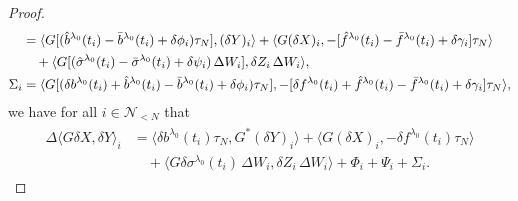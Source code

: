 \documentclass[11pt]{article}
\numberwithin{equation}{section}
\theoremstyle{definition}
\theoremstyle{remark}
\def\l{\label}  \def\f{\frac}  \def\fa{\forall}
\def \la{\langle} \def\ra{\rangle}
\def\cN{\mathcal{N}}
\begin{document}
\begin{proof}
\begin{align*}
&=
\la G[(\hat{b}^{\lam_0}(t_{i})-\bar{b}^{\lam_0}(t_{i})+\delta \phi_{i})\tau_N], (\delta Y)_{i}\ra
+\la  G (\delta X)_i, -[\hat{f}^{\lambda_0}(t_{i})-\bar{f}^{\lambda_0}(t_{i})+\delta \gamma_i]\tau_N \ra
\\
& \quad
+ \la G[(\hat{\sigma}^{\lambda_0}(t_i)-\bar{\sigma}^{\lambda_0}(t_i)+\delta \psi_{i})\,\Delta W_i], 
\delta  {Z}_i\,\Delta W_i\ra,  
\\
\Sigma_i
&=
\la  G [(\delta b^{\lambda_0}(t_{i})+\hat{b}^{\lambda_0}(t_{i})-\bar{b}^{\lam_0}(t_{i})+\delta \phi_{i})\tau_N],
-[\delta f^{\lambda_0}(t_{i})+\hat{f}^{\lambda_0}(t_{i})-\bar{f}^{\lambda_0}(t_{i})+\delta \gamma_i]\tau_N
\ra,
 \end{align*}
we have for all $i\in \cN_{<N}$ that
\begin{align*}%
\begin{split}
\Delta \la G\delta X,\delta Y\ra_i
&=
\la \delta b^{\lambda_0}(t_{i})\tau_N, G^*(\delta Y)_{i}\ra
+\la  G (\delta X)_i, -\delta f^{\lambda_0}(t_{i})\tau_N \ra
\\
&\quad
+
\la  G \delta\sigma^{\lambda_0}(t_i)\,\Delta W_i, 
\delta  {Z}_i\,\Delta W_i
\ra
+\Phi_i+\Psi_i+\Sigma_i.
 \end{split}
  \end{align*}
  

\end{proof}
\end{document}
